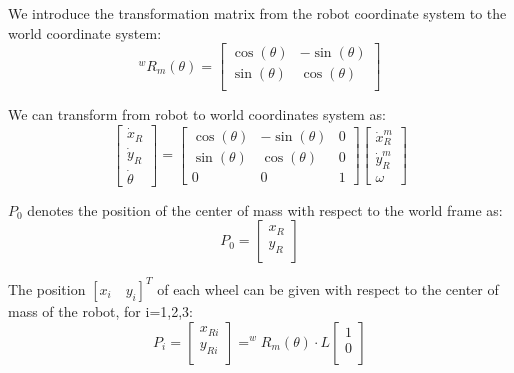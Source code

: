 We introduce the transformation matrix from the robot coordinate system to the world coordinate system:
\begin{equation}
^wR_m(\theta)=\begin{bmatrix}
\cos(\theta) &-\sin(\theta)\\
\sin(\theta) & \cos(\theta)\\
\end{bmatrix}
\end{equation}

We can transform from robot to world coordinates system as:
\begin{equation}
\begin{bmatrix}
\dot{x}_R\\
\dot{y}_R\\
\dot{\theta}
\end{bmatrix} =
\begin{bmatrix}
\cos(\theta) &-\sin(\theta) & 0\\
\sin(\theta) & \cos(\theta) & 0\\
0 & 0 & 1
\end{bmatrix}
\begin{bmatrix}
\dot{x}^m_R\\
\dot{y}^m_R\\
\omega
\end{bmatrix}
\label{rotation}
\end{equation}

$P_0$ denotes the position of the center of mass with respect to the world frame as:
\begin{equation}
P_0 = 	\begin{bmatrix}
x_R\\
y_R\\
\end{bmatrix}
\end{equation}

The position $[x_i\quad y_i]^T$ of each wheel can be given with respect to the center of mass of the robot, for i=1,2,3:
\begin{equation}
P_i = 	\begin{bmatrix}
x_{Ri}\\
y_{Ri}\\
\end{bmatrix} = 
^wR_m(\theta)\cdot L
\begin{bmatrix}
1\\
0\\
\end{bmatrix}
\end{equation}

